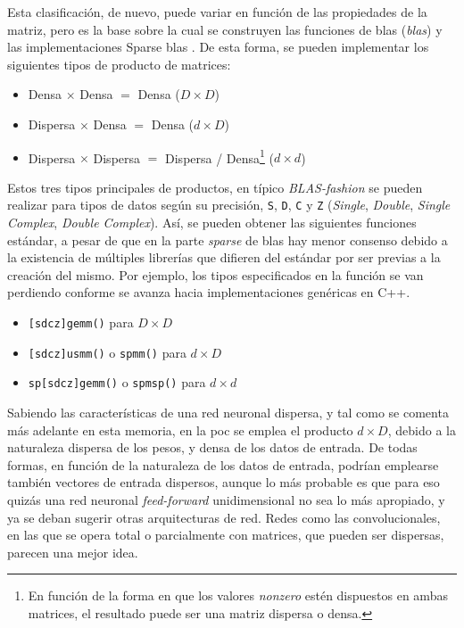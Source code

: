 Esta clasificación, de nuevo, puede variar en función de las propiedades de la matriz, pero es la base sobre la cual se construyen las funciones de \acrshort{blas} (\textit{\acrlong{blas}}) \cite{netlib_blas} y las implementaciones Sparse \acrshort{blas} \cite{sparse_blas_10.1145/567806.567810}. De esta forma, se pueden implementar los siguientes tipos de producto de matrices:

\begin{itemize}
    \item Densa $\times$ Densa $=$ Densa ($D\times D$)
    \item Dispersa $\times$ Densa $=$ Densa ($d\times D$)
    \item Dispersa $\times$ Dispersa $=$ Dispersa / Densa\footnote{En función de la forma en que los valores \textit{nonzero} estén dispuestos en ambas matrices, el resultado puede ser una matriz dispersa o densa.} ($d\times d$)
\end{itemize}

Estos tres tipos principales de productos, en típico \textit{BLAS-fashion} se pueden realizar para tipos de datos según su precisión, \texttt{S}, \texttt{D}, \texttt{C} y \texttt{Z} (\textit{Single}, \textit{Double}, \textit{Single Complex}, \textit{Double Complex}).
Así, se pueden obtener las siguientes funciones estándar, a pesar de que en la parte \textit{sparse} de \acrshort{blas} hay menor consenso debido a la existencia de múltiples librerías que difieren del estándar por ser previas a la creación del mismo. Por ejemplo, los tipos especificados en la función se van perdiendo conforme se avanza hacia implementaciones genéricas en C++.

\begin{itemize}
    \item \texttt{[sdcz]gemm()} para $D\times D$
    \item \texttt{[sdcz]usmm()} o \texttt{spmm()} para $d\times D$
    \item \texttt{sp[sdcz]gemm()} o \texttt{spmsp()} para $d\times d$
\end{itemize}

Sabiendo las características de una red neuronal dispersa, y tal como se comenta más adelante en esta memoria, en la \acrshort{poc} se emplea el producto $d\times D$, debido a la naturaleza dispersa de los pesos, y densa de los datos de entrada. De todas formas, en función de la naturaleza de los datos de entrada, podrían emplearse también vectores de entrada dispersos, aunque lo más probable es que para eso quizás una red neuronal \textit{feed-forward} unidimensional no sea lo más apropiado, y ya se deban sugerir otras arquitecturas de red. Redes como las convolucionales, en las que se opera total o parcialmente con matrices, que pueden ser dispersas, parecen una mejor idea.

